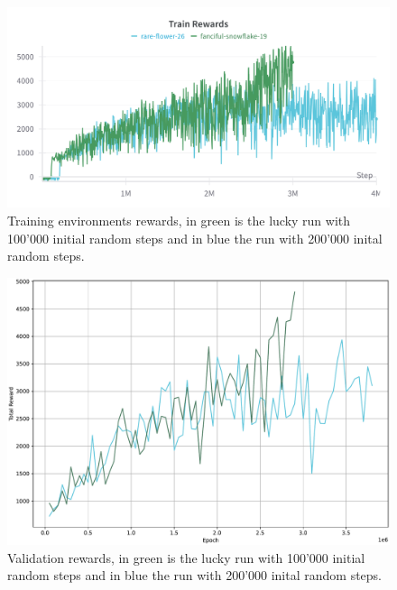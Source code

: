 \documentclass[11pt, a4paper]{article}
\begin{document}
\begin{figure}
    \centering
    \includegraphics[width=15cm]{SAC_train_reward.png}
    \caption{Training environments rewards, in green is the lucky run with 100'000 initial random steps
    and in blue the run with 200'000 inital random steps.}
    \label{SAC:tr_rew}
\end{figure}

\begin{figure}
    \centering
    \includegraphics[width=15cm]{SAC_val_reward.pdf}
    \caption{Validation rewards, in green is the lucky run with 100'000 initial random steps
    and in blue the run with 200'000 inital random steps.}
    \label{SAC:val_rew}
\end{figure}

{}

\end{document}

